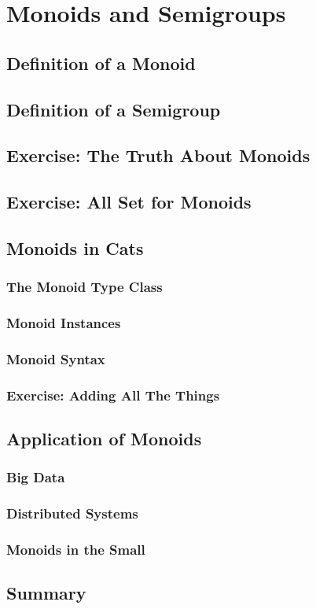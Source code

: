 \documentclass[a4paper]{article}
\begin{document}
\section{Monoids and Semigroups}
\label{sec:org985c9e1}
\subsection{Definition of a Monoid}
\label{sec:orge25e064}
\subsection{Definition of a Semigroup}
\label{sec:orga360834}
\subsection{Exercise: The Truth About Monoids}
\label{sec:org957b20f}
\subsection{Exercise: All Set for Monoids}
\label{sec:org64b1bae}
\subsection{Monoids in Cats}
\label{sec:orgd70a140}
\subsubsection{The Monoid Type Class}
\label{sec:org0d1f03a}
\subsubsection{Monoid Instances}
\label{sec:org78ec741}
\subsubsection{Monoid Syntax}
\label{sec:org607d378}
\subsubsection{Exercise: Adding All The Things}
\label{sec:org9f2f0b5}
\subsection{Application of Monoids}
\label{sec:org2c11507}
\subsubsection{Big Data}
\label{sec:org8ab16d8}
\subsubsection{Distributed Systems}
\label{sec:orga26bfda}
\subsubsection{Monoids in the Small}
\label{sec:orga0f6f22}
\subsection{Summary}
\label{sec:orgbfbe370}
\end{document}
